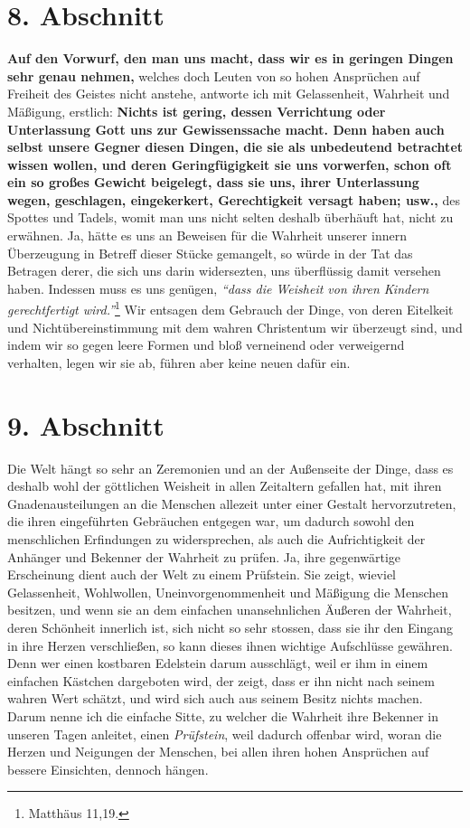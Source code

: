\section{8. Abschnitt} \label{kap9_ab8}

\label{ref:09_08_vorwurff} \textbf{Auf den Vorwurf, den man uns macht, dass wir
es
in geringen Dingen sehr
genau
nehmen,} welches doch Leuten von so hohen Ansprüchen auf Freiheit des Geistes
nicht anstehe, antworte ich mit Gelassenheit, Wahrheit und Mäßigung, erstlich:
\textbf{Nichts ist gering, dessen Verrichtung oder Unterlassung Gott uns zur
Gewissenssache macht. Denn haben auch selbst unsere Gegner diesen Dingen, die
sie als unbedeutend betrachtet wissen wollen, und deren Geringfügigkeit sie uns
vorwerfen, schon oft ein so großes Gewicht beigelegt, dass sie uns, ihrer
Unterlassung wegen, geschlagen, eingekerkert, Gerechtigkeit versagt haben;
usw.,} des Spottes und Tadels, womit man uns nicht selten deshalb
überhäuft
hat, nicht zu erwähnen. Ja, hätte es uns an Beweisen für die Wahrheit unserer
innern Überzeugung in Betreff dieser Stücke gemangelt, so würde in der Tat
das Betragen derer, die sich uns darin widersezten, uns überflüssig damit
versehen haben. Indessen muss es uns genügen,
\textit{"`dass die Weisheit von ihren Kindern gerechtfertigt
wird."'}\footnote{Matthäus 11,19.}
Wir entsagen dem Gebrauch
der Dinge, von deren Eitelkeit und Nichtübereinstimmung mit dem wahren
Christentum wir überzeugt sind, und indem wir so gegen leere Formen und bloß
verneinend oder verweigernd verhalten, legen wir sie ab, führen aber keine neuen
dafür ein.

\section{9. Abschnitt} \label{kap9_ab9}

Die Welt hängt so sehr an Zeremonien und an der Außenseite der Dinge, dass es
deshalb wohl der göttlichen Weisheit in allen Zeitaltern gefallen hat, mit ihren
Gnadenausteilungen an die Menschen allezeit unter einer Gestalt hervorzutreten,
die ihren eingeführten Gebräuchen entgegen war, um dadurch sowohl den
menschlichen Erfindungen zu widersprechen, als auch die Aufrichtigkeit der
Anhänger und Bekenner der Wahrheit zu prüfen. Ja,
ihre
gegenwärtige Erscheinung
dient auch der Welt zu einem Prüfstein. Sie zeigt, wieviel Gelassenheit,
Wohlwollen, Uneinvorgenommenheit und Mäßigung die Menschen besitzen, und wenn
sie
an dem einfachen unansehnlichen Äußeren der Wahrheit, deren Schönheit innerlich
ist, sich nicht so sehr stossen, dass sie ihr den Eingang in ihre Herzen
verschließen, so kann dieses ihnen wichtige Aufschlüsse gewähren. Denn wer einen
kostbaren Edelstein darum ausschlägt, weil er ihm in einem einfachen
Kästchen dargeboten wird, der zeigt, dass er ihn nicht nach seinem wahren Wert
schätzt, und wird sich auch aus seinem Besitz nichts machen. Darum nenne ich die
einfache Sitte, zu welcher die Wahrheit ihre Bekenner in unseren Tagen anleitet,
einen \textit{Prüfstein}, weil dadurch offenbar wird, woran die Herzen und
Neigungen
der Menschen, bei allen ihren hohen Ansprüchen auf bessere Einsichten, dennoch
hängen.

